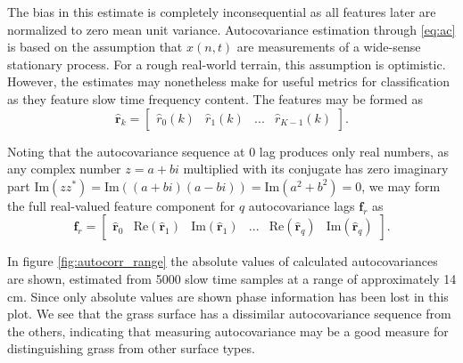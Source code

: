The bias in this estimate is completely inconsequential as all features later are normalized to zero mean unit variance. Autocovariance estimation through \eqref{eq:ac} is based on the assumption that $x(n,t)$ are measurements of a wide-sense stationary process. For a rough real-world terrain, this assumption is optimistic. However, the estimates may nonetheless make for useful metrics for classification as they feature slow time frequency content. The features may be formed as
\begin{equation}
	\hat{\mathbf{r}}_{k} = 
	\begin{bmatrix}
		\hat{r}_0(k) & \hat{r}_1(k) & ... & \hat{r}_{K-1}(k)
	\end{bmatrix}.
\end{equation}

Noting that the autocovariance sequence at 0 lag produces only real numbers, as any complex number $z = a + bi$ multiplied with its conjugate has zero imaginary part $\text{Im}(zz^*) = \text{Im}((a + bi)(a - bi)) = \text{Im}(a^2 + b^2) = 0$, we may form the full real-valued feature component for $q$ autocovariance lags $\mathbf{f}_{r}$ as
\begin{equation}
	\mathbf{f}_{r} = 
	\begin{bmatrix}
		\hat{\mathbf{r}}_{0}  & \text{Re}(\hat{\mathbf{r}}_{1} ) & \text{Im}(\hat{\mathbf{r}}_{1} ) & ... & \text{Re}(\hat{\mathbf{r}}_{q} ) & \text{Im}(\hat{\mathbf{r}}_{q} )
	\end{bmatrix}.
\end{equation}



In figure \ref{fig:autocorr_range} the absolute values of calculated autocovariances are shown, estimated from 5000 slow time samples at a range of approximately 14 cm. Since only absolute values are shown phase information has been lost in this plot. We see that the grass surface has a dissimilar autocovariance sequence from the others, indicating that measuring autocovariance may be a good measure for distinguishing grass from other surface types.  




